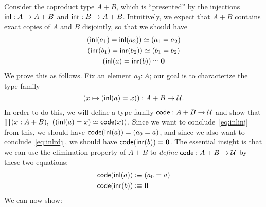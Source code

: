 Consider the coproduct type $A+B$, which is ``presented'' by the injections $\mathsf{inl}:A\to A+B$ and $\mathsf{inr}:B\to A+B$.
Intuitively, we expect that $A+B$ contains exact copies of $A$ and $B$ disjointly, so that we should have
\begin{gather}
  (\mathsf{inl}(a_1)=\mathsf{inl}(a_2)) \simeq (a_1=a_2) \label{eq:inlinj}\\
  (\mathsf{inr}(b_1)=\mathsf{inr}(b_2)) \simeq (b_1=b_2)\\
  (\mathsf{inl}(a)= \mathsf{inr}(b)) \simeq \mathbf{0} \label{eq:inlrdj}
\end{gather}
We prove this as follows.
Fix an element $a_0:A$; our goal is to characterize the type family
\[(x\mapsto (\mathsf{inl}(a)=x)) : A+B \to \mathcal{U}.\]
In order to do this, we will define a type family $\mathsf{code}:A+B\to\mathcal{U}$ and show that $\prd{x:A+B} (\eqv{(\inl(a)=x)}{\code(x)})$.
Since we want to conclude~\eqref{eq:inlinj} from this, we should have $\mathsf{code}(\mathsf{inl}(a)) = (a_0=a)$, and since we also want to conclude~\eqref{eq:inlrdj}, we should have $\mathsf{code} (\mathsf{inr}(b)) = \mathbf{0}$.
The essential insight is that we can use the elimination property of $A+B$ to \emph{define} $\mathsf{code}:A+B\to\mathcal{U}$ by these two equations:
\begin{align*}
  \mathsf{code}(\mathsf{inl}(a)) &\vcentcolon\equiv (a_0=a)\\
  \mathsf{code}(\mathsf{inr}(b)) &\vcentcolon\equiv \mathbf{0}
\end{align*}
We can now show:

